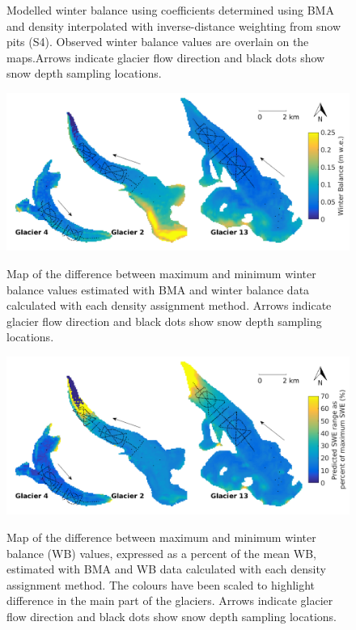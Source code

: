 \documentclass{sfuthesis}
\newcommand{\topomap}{Arrows indicate glacier flow direction and black dots show snow depth sampling locations. }
\begin{document}
\begin{figure}
	\caption{Modelled winter balance using coefficients determined using BMA and density interpolated with inverse-distance weighting from snow pits (S4). Observed winter balance values are overlain on the maps.\topomap}
	\label{fig:BMSmodelledSWE}
\end{figure}

\begin{figure}
	\centering
	\includegraphics[width =\textwidth]{BMS_SWEdifferenceMap.png}\\
	\caption{Map of the difference between maximum and minimum winter balance values estimated with BMA and winter balance data calculated with each density assignment method. \topomap}
	\label{fig:BMS_SWEdiffMap}
\end{figure} 
 
 \begin{figure}
	\centering
	\includegraphics[width =\textwidth]{BMS_SWEdifferenceMap_percent.png}\\
	\caption{Map of the difference between maximum and minimum winter balance (WB) values, expressed as a percent of the mean WB, estimated with BMA and WB data calculated with each density assignment method. The colours have been scaled to highlight difference in the main part of the glaciers. \topomap}
	\label{fig:BMS_SWEdiffMap_precent}
\end{figure} 
\end{document}
